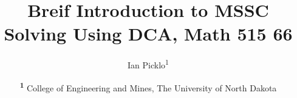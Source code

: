 \documentclass[twocolumn]{NobArticle}
\title{Breif Introduction to MSSC Solving Using DCA, Math 515 66}
\author{
    Ian Picklo\textsuperscript{1}}
\date{
    \textsuperscript{\textbf{1}}
    College of Engineering and Mines, The University of North Dakota \\
}
\begin{document}
\small
\maketitle










\end{document}
